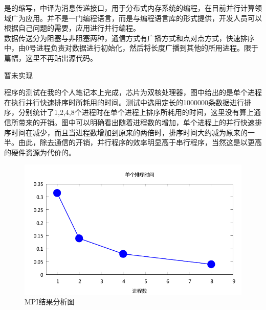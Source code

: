 \documentclass[fontsize=11pt, %
                             paper=a4, %
                             oneside, %
                             captions=tableheading,
                             index=totoc,
                             hyperref]{labbook}
\begin{document}
\begin{addmargin}[0cm]{0cm}

是的缩写，中译为消息传递接口，用于分布式内存系统的编程，在目前并行计算领域广为应用。并不是一门编程语言，而是与编程语言库的形式提供，开发人员可以根据自己问题的需要，应用进行并行编程。\\
数据传送分为阻塞与非阻塞两种，通信方式有广播方式和点对点方式，快速排序中，由0号进程负责对数据进行初始化，然后将长度广播到其他的所用进程。限于篇幅，这里不再贴出源代码。

暂未实现

\indent 程序的测试在我的个人笔记本上完成，芯片为双核处理器，图中给出的是单个进程在执行并行快速排序时所耗用的时间。测试中选用定长的1000000条数据进行排序，分别统计了1,2,4,8个进程时在单个进程上排序所耗用的时间，这里没有算上通信所带来的开销。图中可以明确看出随着进程数的增加，单个进程上的并行快速排序时间在减少，而且当进程数增加到原来的两倍时，排序时间大约减为原来的一半。由此，除去通信的开销，并行程序的效率明显高于串行程序，当然这是以更高的硬件资源为代价的。
\begin{figure}[h!]
\centering
\includegraphics[scale=1,keepaspectratio=true]{analysis.pdf}
\caption{MPI结果分析图}
\label{fig:mpi_analysis}
\end{figure}


\end{addmargin}
\end{document}
